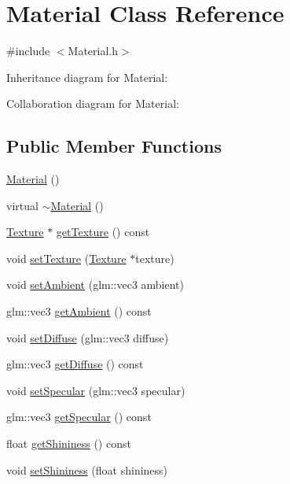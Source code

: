 \hypertarget{classMaterial}{}\section{Material Class Reference}
\label{classMaterial}


{\ttfamily \#include $<$Material.\+h$>$}



Inheritance diagram for Material\+:


Collaboration diagram for Material\+:
\subsection*{Public Member Functions}
\begin{DoxyCompactItemize}
\item 
\hyperlink{classMaterial_a137e987401b63eb7c6c27c3e38bc74b5}{Material} ()
\item 
virtual \hyperlink{classMaterial_a2c19452d71f54075df8f5405b03129f4}{$\sim$\+Material} ()
\item 
\hyperlink{classTexture}{Texture} $\ast$ \hyperlink{classMaterial_a1e0cbeb8397c883361f8f9e4af9497ad}{get\+Texture} () const
\item 
void \hyperlink{classMaterial_af769b6b5b214ec476e3036f16b1e4b00}{set\+Texture} (\hyperlink{classTexture}{Texture} $\ast$texture)
\item 
void \hyperlink{classMaterial_a36e5182a10c739d2479f710bec9efd9a}{set\+Ambient} (glm\+::vec3 ambient)
\item 
glm\+::vec3 \hyperlink{classMaterial_a0d33566869498ffeb5a6983838ccc46f}{get\+Ambient} () const
\item 
void \hyperlink{classMaterial_ad2e2cef942772fc105110072a57e3735}{set\+Diffuse} (glm\+::vec3 diffuse)
\item 
glm\+::vec3 \hyperlink{classMaterial_a33a535aa972c0770bf0e9c7a412304c3}{get\+Diffuse} () const
\item 
void \hyperlink{classMaterial_a7d26a46a86ab91a48a2073f15a3bbdcc}{set\+Specular} (glm\+::vec3 specular)
\item 
glm\+::vec3 \hyperlink{classMaterial_a886ca5380613e1613bf8f2075511b460}{get\+Specular} () const
\item 
float \hyperlink{classMaterial_ac65754d70c261b6065087fe3ce828872}{get\+Shininess} () const
\item 
void \hyperlink{classMaterial_a329d0ae8403956a71b1d45b3284f7dd7}{set\+Shininess} (float shininess)
\item 

\end{DoxyCompactItemize}
